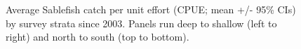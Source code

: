 \documentclass[12pt]{article}\usepackage[]{graphicx}\usepackage[]{color}
\begin{document}
\begin{figure}[htb]

{\centering {} 

}

\caption{Average Sablefish catch per unit effort (CPUE; mean +/- 95\% CIs) by survey strata since 2003. Panels run deep to shallow (left to right) and north to south (top to bottom).}\label{fig:figure7}
\end{figure}
\clearpage
\end{document}
